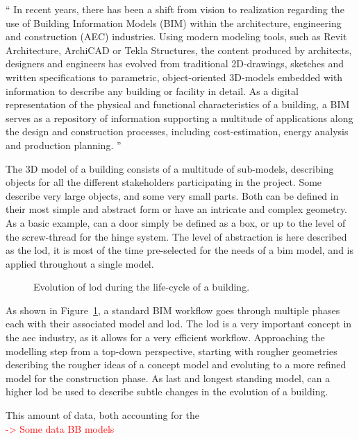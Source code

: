\enquote{
    In recent years, there has been a shift from vision to realization regarding the use of Building Information Models (BIM) within the architecture, engineering and construction (AEC) industries. Using modern modeling tools, such as Revit Architecture, ArchiCAD or Tekla Structures, the content produced by architects, designers and engineers has evolved from traditional 2D-drawings, sketches and written specifications to parametric, object-oriented 3D-models embedded with information to describe any building or facility in detail. As a digital representation of the physical and functional characteristics of a building, a BIM serves as a repository of information supporting a multitude of applications along the design and construction processes, including cost-estimation, energy analysis and production planning.
} \cite{Eastman2008}

The 3D model of a building consists of a multitude of sub-models, describing objects for all the different stakeholders participating in the project. Some describe very large objects, and some very small parts. Both can be defined in their most simple and abstract form or have an intricate and complex geometry. As a basic example, can a door simply be defined as a box, or up to the level of the screw-thread for the hinge system. The level of abstraction is here described as the \ac{lod}, it is most of the time pre-selected for the needs of a \ac{bim} model, and is applied throughout a single model.

\begin{figure}[h]
    \centering
    
    \caption{Evolution of \acs{lod} during the life-cycle of a building.}
    \label{fig:bimGraph}
\end{figure}

As shown in Figure~\ref{fig:bimGraph}, a standard BIM workflow goes through multiple phases each with their associated model and \ac{lod}. The \ac{lod} is a very important concept in the \ac{aec} industry, as it allows for a very efficient workflow. Approaching the modelling step from a top-down perspective, starting with rougher geometries describing the rougher ideas of a concept model and evoluting to a more refined model for the construction phase. As last and longest standing model, can a higher \ac{lod} be used to describe subtle changes in the evolution of a building.

This amount of data, both accounting for the \\
\textcolor{red}{
    -> Some data BB models
}

